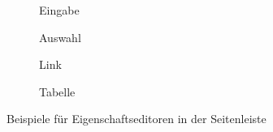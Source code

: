 \begin{figure}[p]
  \begin{subfigure}[b]{0.45\textwidth}
    \caption{Eingabe}
    \label{fig:sidebar-property-editor-input}
  \end{subfigure}\hfill
  \begin{subfigure}[b]{0.45\textwidth}
    \caption{Auswahl}
    \label{fig:sidebar-property-editor-select}
  \end{subfigure}

  \begin{subfigure}[b]{0.45\textwidth}
    \caption{Link}
    \label{fig:sidebar-property-editor-link}
  \end{subfigure}\hfill
  \begin{subfigure}[b]{0.45\textwidth}
    \caption{Tabelle}
    \label{fig:sidebar-property-editor-table}
  \end{subfigure}
  
  \caption{Beispiele für Eigenschaftseditoren in der Seitenleiste}
  \label{fig:sidebar-property-editor}
\end{figure}

